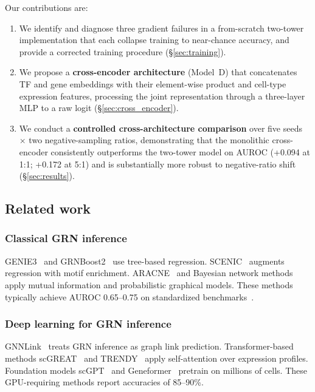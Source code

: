 \documentclass[10pt,twocolumn]{article}
\begin{document}
Our contributions are:
\begin{enumerate}
    \item We identify and diagnose three gradient failures in a from-scratch
    two-tower implementation that each collapse training to near-chance accuracy,
    and provide a corrected training procedure (\S\ref{sec:training}).
    \item We propose a \textbf{cross-encoder architecture} (Model~D) that
    concatenates TF and gene embeddings with their element-wise product and
    cell-type expression features, processing the joint representation through
    a three-layer MLP to a raw logit (\S\ref{sec:cross_encoder}).
    \item We conduct a \textbf{controlled cross-architecture comparison} over
    five seeds $\times$ two negative-sampling ratios, demonstrating that the
    monolithic cross-encoder consistently outperforms the two-tower model on
    AUROC (+0.094 at 1:1; +0.172 at 5:1) and is substantially more robust to
    negative-ratio shift (\S\ref{sec:results}).
\end{enumerate}

\subsection{Related work}
\label{sec:related}

\subsubsection{Classical GRN inference}
GENIE3~\cite{huynh2010inferring} and GRNBoost2~\cite{moerman2019grnboost2}
use tree-based regression.
SCENIC~\cite{aibar2017scenic} augments regression with motif enrichment.
ARACNE~\cite{margolin2006aracne} and Bayesian network methods~\cite{friedman2000bayesian}
apply mutual information and probabilistic graphical models.
These methods typically achieve AUROC 0.65--0.75 on standardized
benchmarks~\cite{pratapa2020benchmarking}.

\subsubsection{Deep learning for GRN inference}
GNNLink~\cite{wang2023gnnlink} treats GRN inference as graph link prediction.
Transformer-based methods scGREAT~\cite{chen2024scgreat} and
TRENDY~\cite{yuan2025trendy} apply self-attention over expression profiles.
Foundation models scGPT~\cite{cui2024scgpt} and
Geneformer~\cite{theodoris2023transfer} pretrain on millions of cells.
These GPU-requiring methods report accuracies of 85--90\%.
\end{document}
